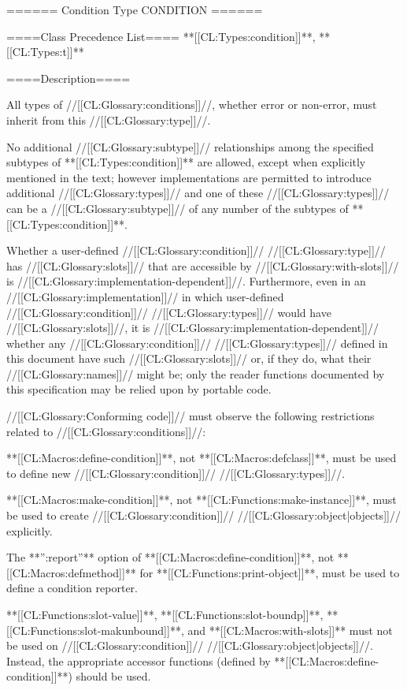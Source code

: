 ====== Condition Type CONDITION ======


====Class Precedence List==== **[[CL:Types:condition]]**, **[[CL:Types:t]]**

====Description====

All types of //[[CL:Glossary:conditions]]//, whether error or non-error, must inherit from this //[[CL:Glossary:type]]//.

No additional //[[CL:Glossary:subtype]]// relationships among the specified subtypes of **[[CL:Types:condition]]** are allowed, except when explicitly mentioned in the text; however implementations are permitted to introduce additional //[[CL:Glossary:types]]// and one of these //[[CL:Glossary:types]]// can be a //[[CL:Glossary:subtype]]// of any number of the subtypes of **[[CL:Types:condition]]**.

Whether a user-defined //[[CL:Glossary:condition]]// //[[CL:Glossary:type]]// has //[[CL:Glossary:slots]]// that are accessible by //[[CL:Glossary:with-slots]]// is //[[CL:Glossary:implementation-dependent]]//. Furthermore, even in an //[[CL:Glossary:implementation]]// in which user-defined //[[CL:Glossary:condition]]// //[[CL:Glossary:types]]// would have //[[CL:Glossary:slots]]//, it is //[[CL:Glossary:implementation-dependent]]// whether any //[[CL:Glossary:condition]]// //[[CL:Glossary:types]]// defined in this document have such //[[CL:Glossary:slots]]// or, if they do, what their //[[CL:Glossary:names]]// might be; only the reader functions documented by this specification may be relied upon by portable code.

//[[CL:Glossary:Conforming code]]// must observe the following restrictions related to //[[CL:Glossary:conditions]]//:

\beginlist \itemitem{\bull} **[[CL:Macros:define-condition]]**, not **[[CL:Macros:defclass]]**, must be used to define new //[[CL:Glossary:condition]]// //[[CL:Glossary:types]]//.

\itemitem{\bull} **[[CL:Macros:make-condition]]**, not **[[CL:Functions:make-instance]]**, must be used to create //[[CL:Glossary:condition]]// //[[CL:Glossary:object|objects]]// explicitly.

\itemitem{\bull} The **'':report''** option of **[[CL:Macros:define-condition]]**, not **[[CL:Macros:defmethod]]** for **[[CL:Functions:print-object]]**, must be used to define a condition reporter.

\itemitem{\bull} **[[CL:Functions:slot-value]]**, **[[CL:Functions:slot-boundp]]**, **[[CL:Functions:slot-makunbound]]**, and **[[CL:Macros:with-slots]]** must not be used on //[[CL:Glossary:condition]]// //[[CL:Glossary:object|objects]]//. Instead, the appropriate accessor functions (defined by **[[CL:Macros:define-condition]]**) should be used. \endlist

    
